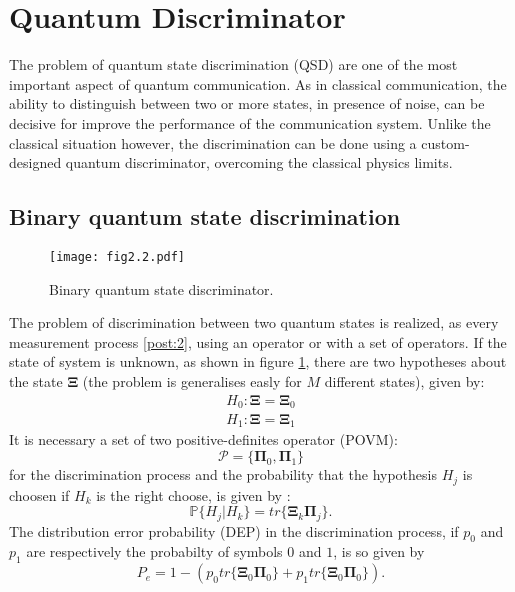 \section{Quantum Discriminator}
    The problem of quantum state discrimination (QSD) are one of the most important
    aspect of quantum communication. As in classical communication, the ability to 
    distinguish between two or more states, in presence of noise, can be decisive for improve
    the performance of the communication system. Unlike the classical situation however,
    the discrimination can be done using a custom-designed quantum discriminator, overcoming
    the classical physics limits.

    \subsection{Binary quantum state discrimination}
    \begin{figure}[ht]
        \begin{center}
            \texttt{[image: fig2.2.pdf]}
            \caption{Binary quantum state discriminator.}
            \label{fig:2.2}
        \end{center}
    \end{figure}
    The problem of discrimination between two quantum states is realized, as every measurement
    process \ref{post:2}, using an operator or with a set of operators.
    If the state of system is unknown, as shown in figure \ref{fig:2.2}, there are two hypotheses
    about the state $\pmb{\Xi}$ (the problem is generalises easly for $M$ different states),
    given by:
    \begin{equation}\begin{split}
        H_0 : \pmb{\Xi}=\pmb{\Xi}_0\\
        H_1 : \pmb{\Xi}=\pmb{\Xi}_1
        \label{eq:binHyp}
    \end{split}\end{equation}
    It is necessary a set of two positive-definites operator (POVM):
    \begin{equation}
        \mathcal{P}=\{\pmb{\Pi}_0,\pmb{\Pi}_1\}
    \end{equation}
    for the discrimination process and the probability that the hypothesis $H_j$ is choosen
    if $H_k$ is the right choose, is given by \cite{tesiGuerrini}:
    \begin{equation}
        \mathbb{P}\{H_j|H_k\}=tr\{\pmb{\Xi}_k\pmb{\Pi}_j\}.
    \end{equation}
    The distribution error probability (DEP) in the discrimination process, if $p_0$ and $p_1$ are 
    respectively the probabilty of symbols $0$ and $1$, is so given by
    \begin{equation}
        P_e=1-\left(p_0 tr\{\pmb{\Xi}_0\pmb{\Pi}_0\}+p_1 tr\{\pmb{\Xi}_0\pmb{\Pi}_0\}\right).
    \end{equation}

